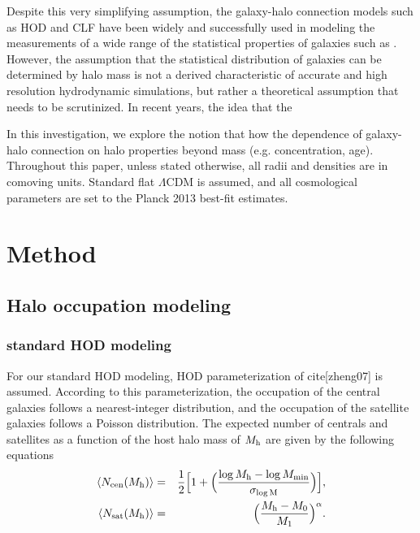 \documentclass[14pt, preprint]{emulateapj}
\begin{document}
Despite this very simplifying assumption, the galaxy-halo connection models such as HOD and CLF
have been widely and successfully used in modeling the measurements of a wide range of the 
statistical properties of galaxies such as . However, the assumption that the statistical 
distribution of galaxies can be determined by halo mass is not a derived characteristic of 
accurate and high resolution hydrodynamic simulations, but rather a theoretical assumption 
that needs to be scrutinized. In recent years, the idea that the   

In this investigation, we explore the notion that how the dependence of 
galaxy-halo connection on halo properties beyond mass (e.g. concentration, age).
Throughout this paper, unless stated otherwise, 
all radii and densities are in comoving units. Standard flat $\Lambda$CDM is assumed, 
and all cosmological parameters are set to the Planck 2013 best-fit estimates.

\section{Method}
\subsection{Halo occupation modeling}
\subsubsection{standard HOD modeling}\label{subsubsec:hod}
For our standard HOD modeling, HOD parameterization of cite[zheng07] is assumed. According to this parameterization, the occupation of the central galaxies follows a nearest-integer distribution, 
and the occupation of the satellite galaxies follows a Poisson distribution. The expected number of centrals and satellites as a function of the host halo mass of $M_{\rm h}$ are given by the following equations 
\begin{eqnarray}
\langle N_{\rm cen}(M_{\rm h}) \rangle &=& \frac{1}{2}\Big[1+\Big(\frac{\log M_{\rm h} - \log M_{\rm min}}{\sigma_{\log \rm{M}}} \Big) \Big], \label{hod:central}\\ 
\langle N_{\rm sat}(M_{\rm h}) \rangle &=& \Big( \frac{M_{\rm h} - M_{\rm{0}}}{M_{\rm 1}} \Big)^{\alpha}. \label{hod:satellite}
\end{eqnarray}
\end{document}

